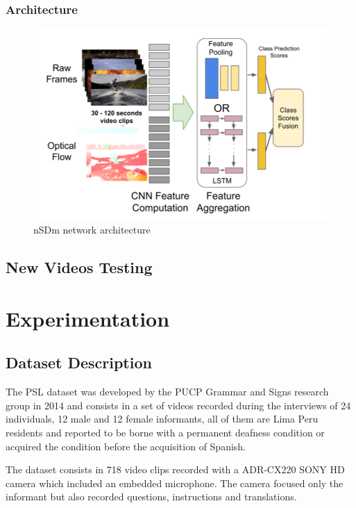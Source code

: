 \documentclass[twocolumn,conference]{article}
\begin{document}
\subsubsection{Architecture}\label{nsdm-architecture}
\begin{figure}[hbt!]
\includegraphics[width=\linewidth]{images/network-architecture.png}
\caption{nSDm network architecture}
\label{fig:opticalflow-two}
\end{figure}
\subsection{New Videos Testing}

\section{Experimentation}\label{experimentation}
\subsection{Dataset Description \cite{lsp_dataset}}\label{datasetdesc}
The PSL dataset was developed by the PUCP Grammar and Signs research group in 2014 and consists in a set of videos recorded during the interviews of 24 individuals, 12 male and 12 female informants, all of them are Lima Peru residents and reported to be borne with a permanent deafness condition or acquired the condition before the acquisition of Spanish. 

The dataset consists in 718 video clips recorded with a ADR-CX220 SONY HD camera which included an embedded microphone. The camera focused only the informant but also recorded questions, instructions and translations.
\end{document}
